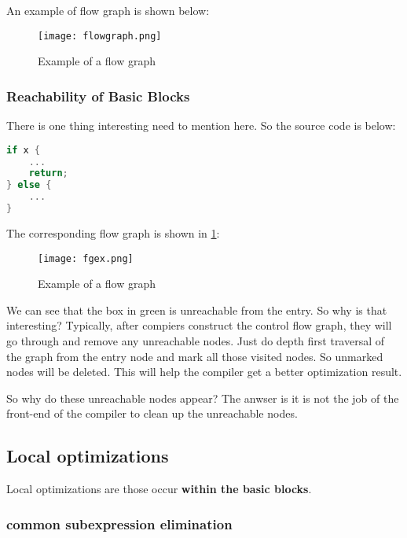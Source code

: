 An example of flow graph is shown below:

\begin{figure}[h]
    \centering
    \texttt{[image: flowgraph.png]}
    \caption{Example of a flow graph}
\end{figure}

\subsubsection{Reachability of Basic Blocks}

There is one thing interesting need to mention here. So the source code is below:

\begin{lstlisting}[language=C, caption=An example]
if x { 
    ...
    return;
} else {
    ...
}


\end{lstlisting}


The corresponding flow graph is shown in \ref{fig:fgex}:

\begin{figure}[h]
    \centering
    \texttt{[image: fgex.png]}
    \caption{Example of a flow graph}
    \label{fig:fgex}
\end{figure}


We can see that the box in green is unreachable from the entry. So why is that interesting? Typically, after compiers 
construct the control flow graph, they will go through and remove any unreachable nodes. Just do depth first traversal of the graph
from the entry node and mark all those visited nodes. So unmarked nodes will be deleted. This will help the compiler get a better optimization
result.


So why do these unreachable nodes appear? The anwser is it is not the job of the front-end of the compiler to clean up the unreachable nodes. 



\subsection{Local optimizations}

Local optimizations are those occur \textbf{within the basic blocks}. 


\subsubsection{common subexpression elimination}

